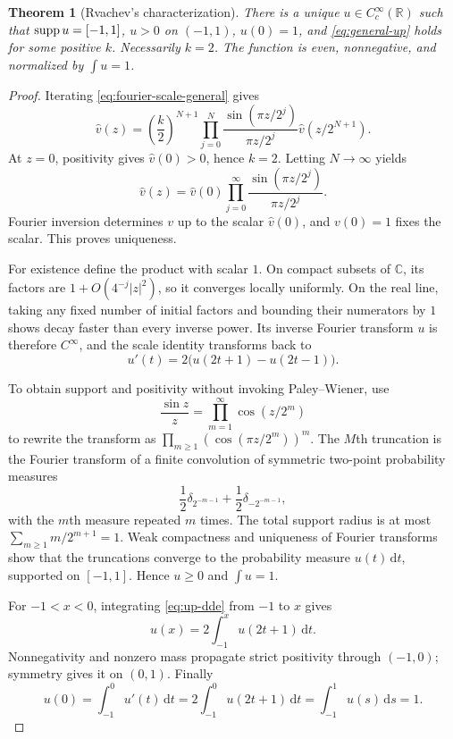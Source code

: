\documentclass[11pt]{article}
\newtheorem{theorem}{Theorem}[section]
\theoremstyle{definition}
\theoremstyle{remark}
\newcommand{\R}{\mathbb R}\newcommand{\C}{\mathbb C}\newcommand{\Z}{\mathbb Z}
\newcommand{\dd}{\,\mathrm d}\newcommand{\e}{\mathrm e}\newcommand{\ii}{\mathrm i}
\begin{document}
\begin{theorem}[Rvachev's characterization]\label{thm:up-existence}
There is a unique $u\in C_c^\infty(\R)$ such that $\operatorname{supp} u=[-1,1]$, $u>0$ on $(-1,1)$, $u(0)=1$, and \eqref{eq:general-up} holds for some positive $k$.  Necessarily $k=2$.  The function is even, nonnegative, and normalized by $\int u=1$.
\end{theorem}
\begin{proof}
Iterating \eqref{eq:fourier-scale-general} gives
\[
 \widehat v(z)=\left(\frac{k}{2}\right)^{N+1}
 \prod_{j=0}^{N}\frac{\sin(\pi z/2^j)}{\pi z/2^j}
 \widehat v(z/2^{N+1}).
\]
At $z=0$, positivity gives $\widehat v(0)>0$, hence $k=2$.  Letting $N\to\infty$ yields
\begin{equation}\label{eq:up-product}
 \widehat v(z)=\widehat v(0)
 \prod_{j=0}^{\infty}\frac{\sin(\pi z/2^j)}{\pi z/2^j}.
\end{equation}
Fourier inversion determines $v$ up to the scalar $\widehat v(0)$, and $v(0)=1$ fixes the scalar.  This proves uniqueness.

For existence define the product with scalar $1$.  On compact subsets of $\C$, its factors are $1+O(4^{-j}|z|^2)$, so it converges locally uniformly.  On the real line, taking any fixed number of initial factors and bounding their numerators by $1$ shows decay faster than every inverse power.  Its inverse Fourier transform $u$ is therefore $C^\infty$, and the scale identity transforms back to
\begin{equation}\label{eq:up-dde}
 u'(t)=2\bigl(u(2t+1)-u(2t-1)\bigr).
\end{equation}

To obtain support and positivity without invoking Paley--Wiener, use
\[
 \frac{\sin z}{z}=\prod_{m=1}^{\infty}\cos(z/2^m)
\]
to rewrite the transform as $\prod_{m\ge1}(\cos(\pi z/2^m))^m$.  The $M$th truncation is the Fourier transform of a finite convolution of symmetric two-point probability measures
\[
 \frac12\delta_{2^{-m-1}}+\frac12\delta_{-2^{-m-1}},
\]
with the $m$th measure repeated $m$ times.  The total support radius is at most
$\sum_{m\ge1}m/2^{m+1}=1$.  Weak compactness and uniqueness of Fourier transforms show that the truncations converge to the probability measure $u(t)\dd t$, supported on $[-1,1]$.  Hence $u\ge0$ and $\int u=1$.

For $-1<x<0$, integrating \eqref{eq:up-dde} from $-1$ to $x$ gives
\begin{equation}\label{eq:positive-propagation}
 u(x)=2\int_{-1}^{x}u(2t+1)\dd t.
\end{equation}
Nonnegativity and nonzero mass propagate strict positivity through $(-1,0)$; symmetry gives it on $(0,1)$.  Finally
\[
 u(0)=\int_{-1}^{0}u'(t)\dd t
 =2\int_{-1}^{0}u(2t+1)\dd t=\int_{-1}^{1}u(s)\dd s=1.
\]
\end{proof}
\end{document}
